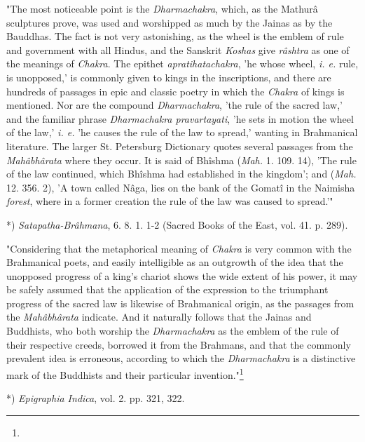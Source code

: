 \documentclass[a4paper, 11pt, oneside, polutonikogreek, english]{article}
\begin{document}
"The most noticeable point is the \emph{Dharmachakra}, which, as the Mathurâ sculptures prove, was used and worshipped as much by the Jainas as by the Bauddhas. The fact is not very astonishing, as the wheel is the emblem of rule and government with all Hindus, and the Sanskrit \emph{Koshas} give \emph{râshtra} as one of the meanings of \emph{Chakra}. The epithet \emph{apratihatachakra}, 'he whose wheel, \emph{i. e.} rule, is unopposed,' is commonly given to kings in the inscriptions, and there are hundreds of passages in epic and classic poetry in which the \emph{Chakra} of kings is mentioned. Nor are the compound \emph{Dharmachakra}, 'the rule of the sacred law,' and the familiar phrase \emph{Dharmachakra pravartayati}, 'he sets in motion the wheel of the law,' \emph{i. e.} 'he causes the rule of the law to spread,' wanting in Brahmanical literature. The larger St. Petersburg Dictionary quotes several passages from the \emph{Mahâbhârata} where they occur. It is said of Bhîshma (\emph{Mah.} 1. 109. 14), 'The rule of the law continued, which Bhîshma had established in the kingdom'; and (\emph{Mah.} 12. 356. 2), 'A town called Nâga, lies on the bank of the Gomatî in the Naimisha \emph{forest}, where in a former creation the rule of the law was caused to spread.'"

*) \emph{Satapatha-Brâhmana}, 6. 8. 1. 1-2 (Sacred Books of the East, vol. 41. p. 289).

"Considering that the metaphorical meaning of \emph{Chakra} is very common with the Brahmanical poets, and easily intelligible as an outgrowth of the idea that the unopposed progress of a king's chariot shows the wide extent of his power, it may be safely assumed that the application of the expression to the triumphant progress of the sacred law is likewise of Brahmanical origin, as the passages from the \emph{Mahâbhârata} indicate. And it naturally follows that the Jainas and Buddhists, who both worship the \emph{Dharmachakra} as the emblem of the rule of their respective creeds, borrowed it from the Brahmans, and that the commonly prevalent idea is erroneous, according to which the \emph{Dharmachakra} is a distinctive mark of the Buddhists and their particular invention."\footnote{}

*) \emph{Epigraphia Indica}, vol. 2. pp. 321, 322.
\end{document}
